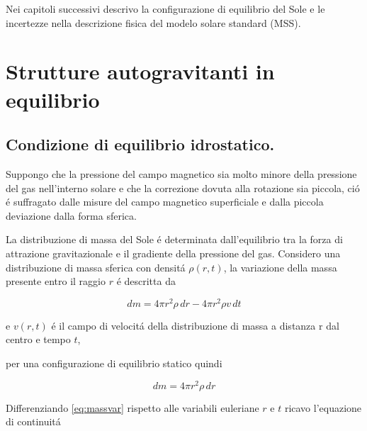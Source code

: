 \documentclass[../main.tex]{subfiles}
\begin{document}


Nei capitoli successivi descrivo la configurazione di equilibrio del Sole e le incertezze nella descrizione fisica del modelo solare standard (MSS).


{\let\clearpage\relax\let\cleardoublepage\relax
\chapter{Strutture autogravitanti in equilibrio}
}

\section{Condizione di equilibrio idrostatico.}

Suppongo che la pressione del campo magnetico sia molto minore della pressione del gas nell'interno solare e che la correzione dovuta alla rotazione sia piccola, ci\'o \'e suffragato dalle misure del campo magnetico superficiale e dalla piccola deviazione dalla forma sferica.


La distribuzione di massa del Sole \'e determinata dall'equilibrio tra la forza di attrazione gravitazionale e il gradiente della pressione del gas. Considero una distribuzione di massa sferica con densit\'a $\rho(r,t)$, la variazione della massa presente entro il raggio $r$ \'e descritta da

\begin{equation}
dm=4\pi r^2\rho \,dr-4\pi r^2\rho v\,dt\label{eq:massvar}
\end{equation}

e $v(r,t)$ \'e il campo di velocit\'a della distribuzione di massa a distanza r dal centro e tempo $t$,


per una configurazione di equilibrio statico quindi

\begin{equation}
dm=4\pi r^2\rho \,dr\label{eq:massaguscio}	
\end{equation}

Differenziando \eqref{eq:massvar} rispetto alle variabili euleriane $r$ e $t$ ricavo l'equazione di continuit\'a
\end{document}
